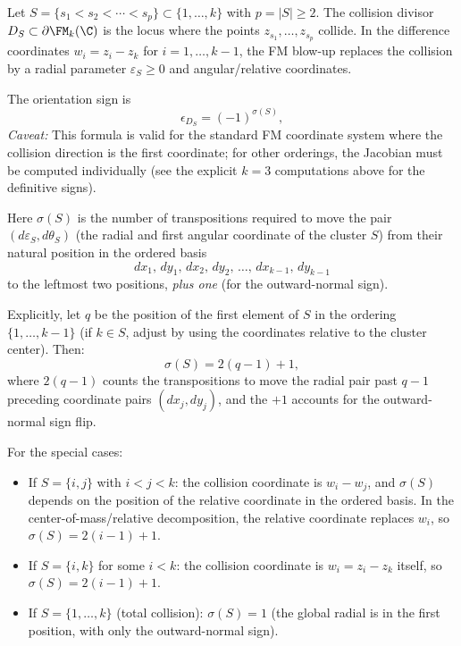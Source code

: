 \begin{proposition}
\label{prop:general-orient-sign}
Let $S = \{s_1 < s_2 < \cdots < s_p\} \subset \{1,\ldots,k\}$ with $p = |S| \ge 2$. The collision divisor $D_S \subset \partial\FM_k(\C)$ is the locus where the points $z_{s_1},\ldots,z_{s_p}$ collide. In the difference coordinates $w_i = z_i - z_k$ for $i = 1,\ldots,k-1$, the FM blow-up replaces the collision by a radial parameter $\varepsilon_S \ge 0$ and angular/relative coordinates.

The orientation sign is
\begin{equation}
\label{eq:general-eps-formula}
\epsilon_{D_S} = (-1)^{\sigma(S)},
\end{equation}
\emph{Caveat:} This formula is valid for the standard FM coordinate system where the collision direction is the first coordinate; for other orderings, the Jacobian must be computed individually (see the explicit $k=3$ computations above for the definitive signs).

\noindent Here $\sigma(S)$ is the number of transpositions required to move the pair $(d\varepsilon_S, d\theta_S)$ (the radial and first angular coordinate of the cluster $S$) from their natural position in the ordered basis
\[
dx_1,\, dy_1,\, dx_2,\, dy_2,\, \ldots,\, dx_{k-1},\, dy_{k-1}
\]
to the leftmost two positions, \emph{plus one} (for the outward-normal sign).

Explicitly, let $q$ be the position of the first element of $S$ in the ordering $\{1,\ldots,k-1\}$ (if $k\in S$, adjust by using the coordinates relative to the cluster center). Then:
\begin{equation}
\label{eq:sigma-S-formula}
\sigma(S) = 2(q-1) + 1,
\end{equation}
where $2(q-1)$ counts the transpositions to move the radial pair past $q-1$ preceding coordinate pairs $(dx_j,dy_j)$, and the $+1$ accounts for the outward-normal sign flip.

For the special cases:
\begin{itemize}
\item If $S = \{i,j\}$ with $i < j < k$: the collision coordinate is $w_i - w_j$, and $\sigma(S)$ depends on the position of the relative coordinate in the ordered basis. In the center-of-mass/relative decomposition, the relative coordinate replaces $w_i$, so $\sigma(S) = 2(i-1)+1$.
\item If $S = \{i,k\}$ for some $i < k$: the collision coordinate is $w_i = z_i - z_k$ itself, so $\sigma(S) = 2(i-1)+1$.
\item If $S = \{1,\ldots,k\}$ (total collision): $\sigma(S) = 1$ (the global radial is in the first position, with only the outward-normal sign).
\end{itemize}
\end{proposition}

